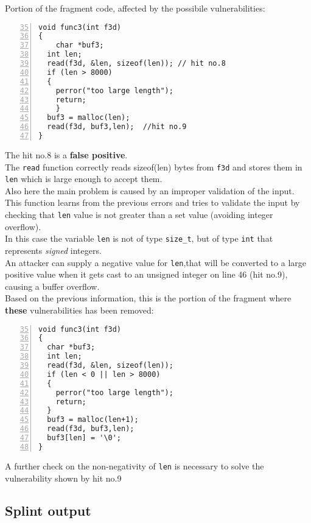 \documentclass[a4paper,12pt]{article}
\begin{document}
\noindent
Portion of the fragment code, affected by the possibile vulnerabilities:
\begin{lstlisting}[style=c,numbers=left,firstnumber=35,linebackgroundcolor={
\ifnum\value{lstnumber}=39\color{green}\fi
\ifnum\value{lstnumber}=46\color{red}\fi}]
void func3(int f3d)
{
	char *buf3;
  int len;
  read(f3d, &len, sizeof(len)); // hit no.8
  if (len > 8000) 
  { 
  	perror("too large length");
  	return; 
	}
  buf3 = malloc(len);
  read(f3d, buf3,len);	//hit no.9
}
\end{lstlisting}
The hit no.8 is a \textbf{false positive}.\\
The \texttt{read} function correctly reads sizeof(len) bytes from \texttt{f3d} and stores them in \texttt{len} which is large enough to accept them.\\
Also here the main problem is caused by an improper validation of the input.\\
This function learns from the previous errors and tries to validate the input by checking that \texttt{len} value is not greater than a set value (avoiding integer overflow).\\
In this case the variable \texttt{len} is not of type \texttt{size\_t}, but of type \texttt{int} that represents \emph{signed} integers.\\
An attacker can supply a negative value for \texttt{len},that  will be converted to a large positive value when it gets cast to an unsigned integer on line 46 (hit no.9), causing a buffer overflow.\\
\newpage
\noindent
Based on the previous information, this is the portion of the fragment where \textbf{these} vulnerabilities has been removed:
\begin{lstlisting}[style=c,numbers=left,firstnumber=35,linebackgroundcolor={
\ifnum\value{lstnumber}=39\color{green}\fi
\ifnum\value{lstnumber}=40\color{green}\fi
\ifnum\value{lstnumber}=46\color{green}\fi}]
void func3(int f3d)
{
  char *buf3;
  int len;
  read(f3d, &len, sizeof(len));
  if (len < 0 || len > 8000) 
  { 
  	perror("too large length");
  	return; 
  }
  buf3 = malloc(len+1);
  read(f3d, buf3,len);
  buf3[len] = '\0';        
}
\end{lstlisting}
A further check on the non-negativity of \texttt{len} is necessary to solve the vulnerability shown by hit no.9
\newpage
\subsection{Splint output}
\end{document}
